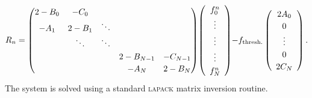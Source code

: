 \documentclass[11pt]{article}
\begin{document}
\begin{align}
  R_n = 
\begin{aligned}
    \renewcommand{\arraystretch}{1.2}
    \setlength\arraycolsep{5pt}
    \begin{pmatrix}
      2-B_0 & - C_0   \\ 
      -A_1  & 2-B_1 & \ddots \\
      & \ddots  & \ddots \\
      &    &      & 2-B_{N-1} & -C_{N-1} \\
      &    &      & -A_{N}    & 2-B_{N}
    \end{pmatrix}
  \end{aligned}
 \begin{aligned}
    \left(
    \begin{array}{c}
      f^{n}_{0} \\
      \vdots \\
      \vdots \\
      \vdots \\
      f^{n}_{N}
    \end{array}
     \right)   
  \end{aligned} 
 \begin{aligned}
    \renewcommand{\arraystretch}{1.2}
     -f_{\text{thresh.}} \left(
    \begin{array}{c}
      2A_0\\
      0 \\
      \vdots \\
      0 \\
      2C_N
    \end{array}
     \right).    
  \end{aligned} 
\end{align}
%
The system is solved using a standard \textsc{lapack} matrix inversion routine.


\end{document}

